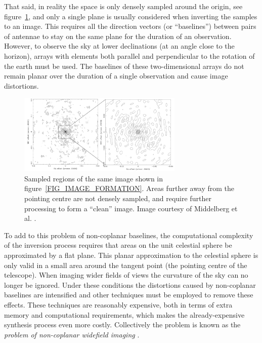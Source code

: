\documentclass[a4paper, two column]{article}
\begin{document}
That said, in reality the space is only densely sampled around the origin, see figure~\ref{FIG_PSF}, and only a single plane is usually considered when inverting the samples to an image. This 
requires all the direction vectors (or ``baselines'') between pairs of antennae to stay on the same plane for the duration of an observation. However, to observe the sky at lower declinations 
(at an angle close to the horizon), arrays with elements both parallel and perpendicular to the rotation of the earth must be used. The baselines of these two-dimensional arrays do not remain 
planar over the duration of a single observation and cause image distortions. 

\begin{figure}[ht]
 \begin{mdframed}
 \centering
 \includegraphics[width=0.7\textwidth]{psf.png}
 \caption[PSF]{Sampled regions of the same image shown in figure~\ref{FIG_IMAGE_FORMATION}. Areas further away from the pointing centre are not densely sampled, and require further processing to form a
 ``clean'' image. Image courtesy of Middelberg et al. \cite{middelberg2008high}.}
  \label{FIG_PSF}
 \end{mdframed}
\end{figure}

To add to this problem of non-coplanar baselines, the computational complexity of the inversion process requires that areas on the unit celestial sphere be approximated by a flat plane. This 
planar approximation to the celestial sphere is only valid in a small area around the tangent point (the pointing centre of the telescope). When imaging wider fields of views the curvature of the sky
can no longer be ignored. Under these conditions the distortions caused by non-coplanar baselines are intensified and other techniques must be employed to remove these effects. These techniques are
reasonably expensive, both in terms of extra memory and computational requirements, which makes the already-expensive synthesis process even more costly. Collectively the problem is known as the 
\textit{problem of non-coplanar widefield imaging} \cite{taylor1999synthesis}. 
\end{document}
